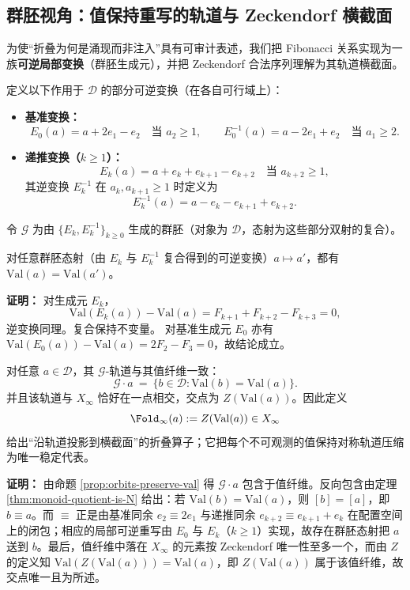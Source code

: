 \subsection{群胚视角：值保持重写的轨道与 Zeckendorf 横截面}\label{sec:groupoid-zeckendorf}

为使“折叠为何是涌现而非注入”具有可审计表述，我们把 Fibonacci 关系实现为一族\textbf{可逆局部变换}（群胚生成元），并把 Zeckendorf 合法序列理解为其轨道横截面。

\begin{definition}\label{def:fib-moves}
定义以下作用于 $\mathcal{D}$ 的部分可逆变换（在各自可行域上）：
\begin{itemize}
  \item \textbf{基准变换：}
  \[
  E_0(a)=a+2e_1-e_2\quad\text{当 }a_{2}\ge 1,
  \qquad
  E_0^{-1}(a)=a-2e_1+e_2\quad\text{当 }a_{1}\ge 2.
  \]
  \item \textbf{递推变换（$k\ge 1$）：}
  \[
  E_k(a)=a+e_k+e_{k+1}-e_{k+2}\quad\text{当 }a_{k+2}\ge 1,
  \]
  其逆变换 $E_k^{-1}$ 在 $a_k,a_{k+1}\ge 1$ 时定义为
  \[
  E_k^{-1}(a)=a-e_k-e_{k+1}+e_{k+2}.
  \]
\end{itemize}
令 $\mathcal{G}$ 为由 $\{E_k,E_k^{-1}\}_{k\ge 0}$ 生成的群胚（对象为 $\mathcal{D}$，态射为这些部分双射的复合）。
\end{definition}

\begin{proposition}[轨道不变量]\label{prop:orbits-preserve-val}
对任意群胚态射（由 $E_k$ 与 $E_k^{-1}$ 复合得到的可逆变换）$a\mapsto a'$，都有 $\mathrm{Val}(a)=\mathrm{Val}(a')$。
\end{proposition}

\textbf{证明：}
对生成元 $E_k$，
\[
\mathrm{Val}(E_k(a))-\mathrm{Val}(a)
=F_{k+1}+F_{k+2}-F_{k+3}=0,
\]
逆变换同理。复合保持不变量。
对基准生成元 $E_0$ 亦有 $\mathrm{Val}(E_0(a))-\mathrm{Val}(a)=2F_2-F_3=0$，故结论成立。

\begin{theorem}[轨道横截面与折叠的群论解释]\label{thm:zeckendorf-transversal}
对任意 $a\in\mathcal{D}$，其 $\mathcal{G}$-轨道与其值纤维一致：
\[
\mathcal{G}\cdot a \ =\ \{b\in\mathcal{D}:\mathrm{Val}(b)=\mathrm{Val}(a)\}.
\]
并且该轨道与 $X_\infty$ 恰好在一点相交，交点为 $Z(\mathrm{Val}(a))$。因此定义
\[
\Fold_\infty(a):=Z(\mathrm{Val}(a))\in X_\infty
\]
给出“沿轨道投影到横截面”的折叠算子；它把每个不可观测的值保持对称轨道压缩为唯一稳定代表。
\end{theorem}

\textbf{证明：}
由命题 \ref{prop:orbits-preserve-val} 得 $\mathcal{G}\cdot a$ 包含于值纤维。反向包含由定理 \ref{thm:monoid-quotient-is-N} 给出：若 $\mathrm{Val}(b)=\mathrm{Val}(a)$，则 $[b]=[a]$，即 $b\equiv a$。而 $\equiv$ 正是由基准同余 $e_2\equiv 2e_1$ 与递推同余 $e_{k+2}\equiv e_{k+1}+e_k$ 在配置空间上的闭包；相应的局部可逆重写由 $E_0$ 与 $E_k$（$k\ge 1$）实现，故存在群胚态射把 $a$ 送到 $b$。最后，值纤维中落在 $X_\infty$ 的元素按 Zeckendorf 唯一性至多一个，而由 $Z$ 的定义知 $\mathrm{Val}(Z(\mathrm{Val}(a)))=\mathrm{Val}(a)$，即 $Z(\mathrm{Val}(a))$ 属于该值纤维，故交点唯一且为所述。


